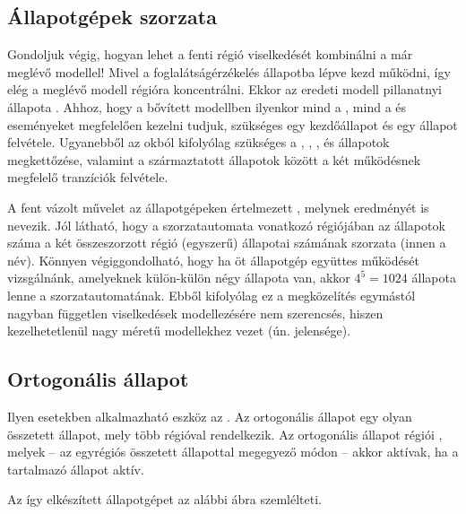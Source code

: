 \subsection{Állapotgépek szorzata}

Gondoljuk végig, hogyan lehet a fenti  régió viselkedését kombinálni a már meglévő modellel! Mivel a foglalátságérzékelés  állapotba lépve kezd működni, így elég a meglévő modell  régióra koncentrálni. Ekkor az eredeti modell pillanatnyi állapota . Ahhoz, hogy a bővített modellben ilyenkor mind a , mind a  és  eseményeket megfelelően kezelni tudjuk, szükséges egy  kezdőállapot és egy  állapot felvétele. Ugyanebből az okból kifolyólag szükséges a , , ,  és  állapotok megkettőzése, valamint a származtatott állapotok között a két működésnek megfelelő tranzíciók felvétele.

A fent vázolt művelet az állapotgépeken értelmezett , melynek eredményét  is nevezik. Jól látható, hogy a szorzatautomata vonatkozó régiójában az állapotok száma a két összeszorzott régió (egyszerű) állapotai számának szorzata (innen a név). Könnyen végiggondolható, hogy ha öt állapotgép együttes működését vizsgálnánk, amelyeknek külön-külön négy állapota van, akkor $4^5=1024$ állapota lenne a szorzatautomatának. Ebből kifolyólag ez a megközelítés egymástól nagyban független viselkedések modellezésére nem szerencsés, hiszen kezelhetetlenül nagy méretű modellekhez vezet (ún.  jelensége).

\subsection{Ortogonális állapot}

Ilyen esetekben alkalmazható eszköz az . Az ortogonális állapot egy olyan összetett állapot, mely több régióval rendelkezik. Az ortogonális állapot régiói , melyek -- az egyrégiós összetett állapottal megegyező módon -- akkor aktívak, ha a tartalmazó állapot aktív.

Az így elkészített állapotgépet az alábbi ábra szemlélteti.

\begin{fektetett}
\end{fektetett}

